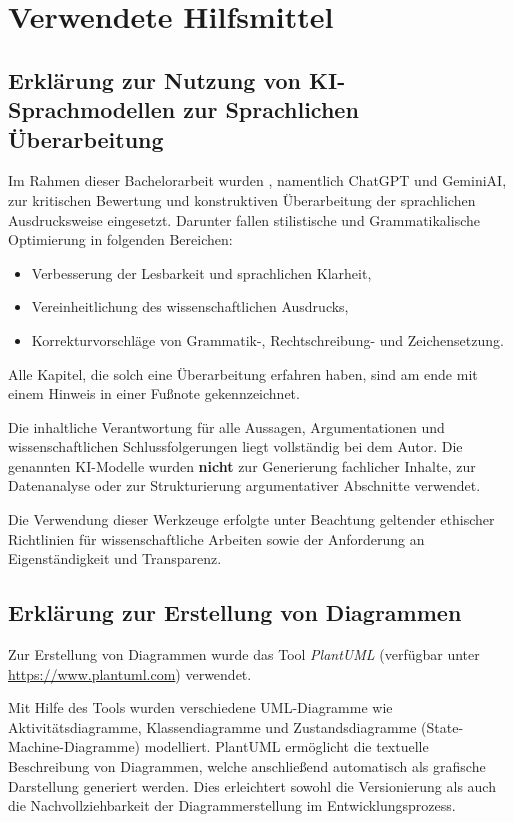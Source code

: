 
\section{Verwendete Hilfsmittel}

\subsection{Erkl\"arung zur Nutzung von KI-Sprachmodellen zur Sprachlichen \"Uberarbeitung}
Im Rahmen dieser Bachelorarbeit wurden , namentlich ChatGPT und GeminiAI, zur kritischen Bewertung und konstruktiven \"Uberarbeitung der sprachlichen Ausdrucksweise eingesetzt. Darunter fallen stilistische und Grammatikalische Optimierung in folgenden Bereichen:

\begin{itemize}
	\item Verbesserung der Lesbarkeit und sprachlichen Klarheit,
	\item Vereinheitlichung des wissenschaftlichen Ausdrucks,
	\item Korrekturvorschl\"age von Grammatik-, Rechtschreibung- und Zeichensetzung.
\end{itemize}

Alle Kapitel, die solch eine \"Uberarbeitung erfahren haben, sind am ende mit einem Hinweis in einer Fu{\ss}note gekennzeichnet.

Die inhaltliche Verantwortung f\"ur alle Aussagen, Argumentationen und wissenschaftlichen Schlussfolgerungen liegt vollst\"andig bei dem Autor. Die genannten KI-Modelle wurden \textbf{nicht} zur Generierung fachlicher Inhalte, zur Datenanalyse oder zur Strukturierung argumentativer Abschnitte verwendet.

Die Verwendung dieser Werkzeuge erfolgte unter Beachtung geltender ethischer Richtlinien f\"ur wissenschaftliche Arbeiten sowie der Anforderung an Eigenst\"andigkeit und Transparenz.

\subsection{Erkl\"arung zur Erstellung von Diagrammen}

Zur Erstellung von Diagrammen wurde das Tool \textit{PlantUML} (verf\"ugbar unter \url{https://www.plantuml.com}) verwendet. 

Mit Hilfe des Tools wurden verschiedene UML-Diagramme wie Aktivit\"atsdiagramme, Klassendiagramme und Zustandsdiagramme (State-Machine-Diagramme) modelliert. PlantUML erm\"oglicht die textuelle Beschreibung von Diagrammen, welche anschlie{\ss}end automatisch als grafische Darstellung generiert werden. Dies erleichtert sowohl die Versionierung als auch die Nachvollziehbarkeit der Diagrammerstellung im Entwicklungsprozess.